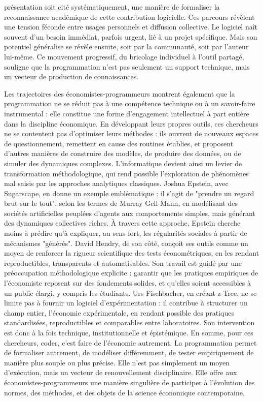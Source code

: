 présentation soit cité systématiquement, une manière de formaliser la reconnaissance académique de cette contribution logicielle. Ces parcours révèlent une tension féconde entre usages personnels et diffusion collective. Le logiciel naît souvent d’un besoin immédiat, parfois urgent, lié à un projet spécifique. Mais son potentiel généralise se révèle ensuite, soit par la communauté, soit par l’auteur lui-même. Ce mouvement progressif, du bricolage individuel à l’outil partagé, souligne que la programmation n’est pas seulement un support technique, mais un vecteur de production de connaissances.


Les trajectoires des économistes-programmeurs montrent également que la programmation ne se réduit pas à une compétence technique ou à un savoir-faire instrumental : elle constitue une forme d’engagement intellectuel à part entière dans la discipline économique. En développant leurs propres outils, ces chercheurs ne se contentent pas d’optimiser leurs méthodes : ils ouvrent de nouveaux espaces de questionnement, remettent en cause des routines établies, et proposent d’autres manières de construire des modèles, de produire des données, ou de simuler des dynamiques complexes. L’informatique devient ainsi un levier de transformation méthodologique, qui rend possible l’exploration de phénomènes mal saisis par les approches analytiques classiques. Joshua Epstein, avec Sugarscape, en donne un exemple emblématique : il s’agit de "prendre un regard brut sur le tout", selon les termes de Murray Gell-Mann, en modélisant des sociétés artificielles peuplées d’agents aux comportements simples, mais générant des dynamiques collectives riches. À travers cette approche, Epstein cherche moins à prédire qu’à expliquer, au sens fort, les régularités sociales à partir de mécanismes "générés". David Hendry, de son côté, conçoit ses outils comme un moyen de renforcer la rigueur scientifique des tests économétriques, en les rendant reproductibles, transparents et automatisables. Son travail est guidé par une préoccupation méthodologique explicite : garantir que les pratiques empiriques de l’économiste reposent sur des fondements solides, et qu’elles soient accessibles à un public élargi, y compris les étudiants. Urs Fischbacher, en créant z-Tree, ne se limite pas à fournir un logiciel d’expérimentation : il contribue à structurer un champ entier, l’économie expérimentale, en rendant possible des pratiques standardisées, reproductibles et comparables entre laboratoires. Son intervention est donc à la fois technique, institutionnelle et épistémique. En somme, pour ces chercheurs, coder, c’est faire de l’économie autrement. La programmation permet de formaliser autrement, de modéliser différemment, de tester empiriquement de manière plus souple ou plus précise. Elle n’est pas simplement un moyen d’exécution, mais un vecteur de renouvellement disciplinaire. Elle offre aux économistes-programmeurs une manière singulière de participer à l’évolution des normes, des méthodes, et des objets de la science économique contemporaine.


